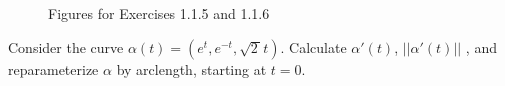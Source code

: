 \documentclass[Shifrin_Solutions_Spring_2018]{subfiles}
\begin{document}
\begin{figure}[h]
\centering
{}
  \caption{Figures for Exercises 1.1.5 and 1.1.6}
\end{figure}





\begin{exercise}
Consider the curve $\alpha(t) = \left( e^t , e^{-t} , \sqrt{2\,} t \right)$. Calculate $\alpha'(t)$, $||\alpha'(t)||$ , and reparameterize $\alpha$ by arclength, starting at $t=0$.
\end{exercise}
\end{document}
